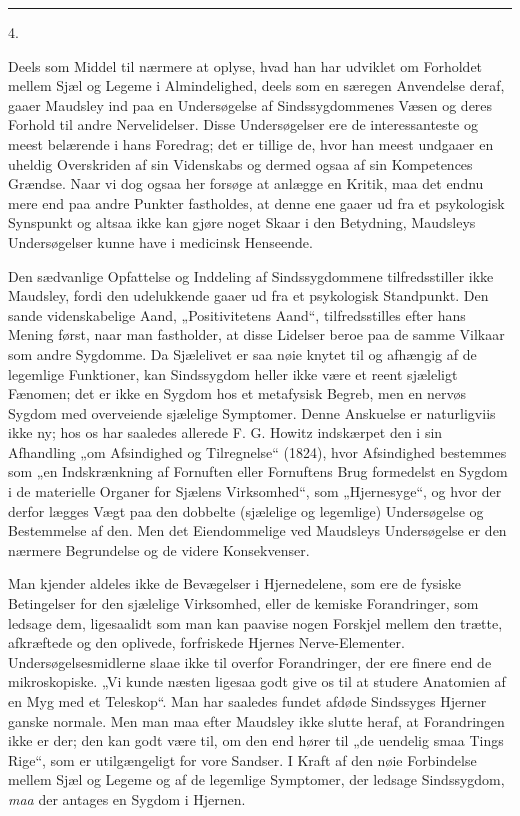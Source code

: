 \documentclass[12pt,a4paper,openany]{book}
\newcommand{\secnum}[1]{\par\begin{center}#1\end{center}\par\nobreak}
\newcommand{\opage}[1]{\marginnote{\footnotesize\textit{[#1]}}}
\begin{document}
\begin{center}\rule{1.8cm}{0.4pt}\end{center}

\secnum{4.}

Deels som Middel til nærmere at oplyse, hvad han
har udviklet om Forholdet mellem Sjæl og Legeme i Almindelighed,
deels som en særegen Anvendelse deraf, gaaer
Maudsley ind paa en Undersøgelse af Sindssygdommenes
Væsen og deres Forhold til andre Nervelidelser. Disse
Undersøgelser ere de interessanteste og meest belærende i
hans Foredrag; det er tillige de, hvor han meest undgaaer
en uheldig Overskriden af sin Videnskabs og dermed ogsaa
af sin Kompetences Grændse. Naar vi dog ogsaa her
forsøge at anlægge en Kritik, maa det endnu mere end
paa andre Punkter fastholdes, at denne ene gaaer ud fra et
psykologisk Synspunkt og altsaa ikke kan gjøre noget Skaar
i den Betydning, Maudsleys Undersøgelser kunne have i
medicinsk Henseende.

Den sædvanlige Opfattelse og Inddeling af Sindssygdommene
tilfredsstiller ikke Maudsley, fordi den udelukkende
gaaer ud fra et psykologisk Standpunkt. Den sande videnskabelige
Aand, „Positivitetens Aand“, tilfredsstilles efter
hans Mening først, naar man fastholder, at disse
Lidelser beroe paa de samme Vilkaar som andre Sygdomme.
Da Sjælelivet er saa nøie knytet til og afhængig
af de legemlige Funktioner, kan Sindssygdom
heller ikke være et reent sjæleligt Fænomen; det er ikke en
Sygdom hos et metafysisk Begreb, men en nervøs Sygdom
med overveiende sjælelige Symptomer. Denne Anskuelse er
naturligviis ikke ny; hos os har saaledes allerede F. G.
\opage{323}Howitz indskærpet den i sin Afhandling „om Afsindighed og
Tilregnelse“ (1824), hvor Afsindighed bestemmes som „en
Indskrænkning af Fornuften eller Fornuftens Brug formedelst
en Sygdom i de materielle Organer for Sjælens Virksomhed“,
som „Hjernesyge“, og hvor der derfor lægges Vægt
paa den dobbelte (sjælelige og legemlige) Undersøgelse og
Bestemmelse af den. Men det Eiendommelige ved Maudsleys
Undersøgelse er den nærmere Begrundelse og de videre
Konsekvenser.

Man kjender aldeles ikke de Bevægelser i Hjernedelene, som
ere de fysiske Betingelser for den sjælelige Virksomhed, eller
de kemiske Forandringer, som ledsage dem, ligesaalidt som
man kan paavise nogen Forskjel mellem den trætte, afkræftede
og den oplivede, forfriskede Hjernes Nerve-Elementer.
Undersøgelsesmidlerne slaae ikke til overfor Forandringer, der
ere finere end de mikroskopiske. „Vi kunde næsten ligesaa
godt give os til at studere Anatomien af en Myg med et
Teleskop“. Man har saaledes fundet afdøde Sindssyges
Hjerner ganske normale. Men man maa efter Maudsley
ikke slutte heraf, at Forandringen ikke er der; den kan godt
være til, om den end hører til „de uendelig smaa Tings
Rige“, som er utilgængeligt for vore Sandser. I Kraft af
den nøie Forbindelse mellem Sjæl og Legeme og af de
legemlige Symptomer, der ledsage Sindssygdom, \emph{maa} der
antages en Sygdom i Hjernen.
\end{document}
